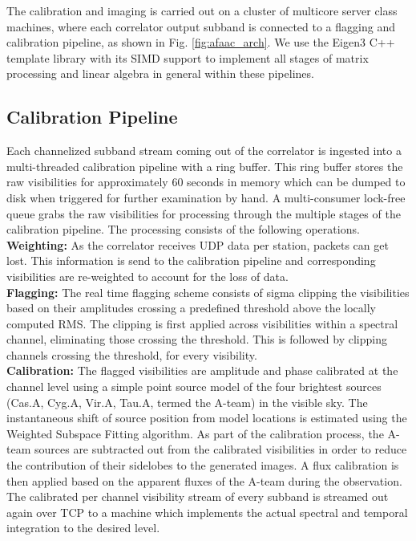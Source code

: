 \documentclass{ws-jai}
\begin{document}
The calibration  and imaging  is carried  out on a  cluster of  multicore server
class machines, where each correlator output  subband is connected to a flagging
and calibration  pipeline, as  shown in Fig.   \ref{fig:afaac_arch}. We  use the
Eigen3 \citep{eigenweb} C++ template library  with its SIMD support to implement
all  stages of  matrix processing  and linear  algebra in  general within  these
pipelines.\\

\subsection{Calibration Pipeline} Each channelized subband stream coming out of the
correlator  is  ingested  into  a  multi-threaded  calibration  pipeline  with  a
ring buffer. This ring buffer  stores the raw visibilities  for approximately $60$
seconds  in memory  which  can be  dumped  to disk  when  triggered for  further
examination by hand. A multi-consumer lock-free queue grabs the raw visibilities
for  processing through  the multiple  stages of  the calibration  pipeline. The
processing consists of the following operations.\\

\noindent \textbf {Weighting:} As the  correlator receives UDP data per station,
packets can get  lost. This information is send to  the calibration pipeline and
corresponding visibilities are re-weighted to account for the loss of data. \\

\noindent \textbf  {Flagging:} The  real time flagging  scheme consists  of sigma
clipping  the  visibilities based  on  their  amplitudes crossing  a  predefined
threshold above the  locally computed RMS. The clipping is  first applied across
visibilities  within   a  spectral  channel,  eliminating   those  crossing  the
threshold. This  is followed  by clipping channels  crossing the  threshold, for
every visibility.\\


\noindent  \textbf {Calibration:}  The  flagged visibilities  are amplitude  and
phase calibrated at the  channel level using a simple point  source model of the
four brightest  sources (Cas.A, Cyg.A, Vir.A,  Tau.A, termed the A-team)  in the
visible sky. The instantaneous shift of  source position from model locations is
estimated  using  the  Weighted Subspace  Fitting  \citep  {viberg1991detection}
algorithm. As part of the calibration process, the A-team sources are subtracted
out from  the calibrated  visibilities in  order to  reduce the  contribution of
their sidelobes  to the  generated images.  A flux  calibration is  then applied
based  on  the  apparent  fluxes  of the  A-team  during  the  observation.  The
calibrated per channel visibility stream of  every subband is streamed out again
over  TCP  to a  machine  which  implements  the  actual spectral  and  temporal
integration to the desired level.\\
\end{document}
